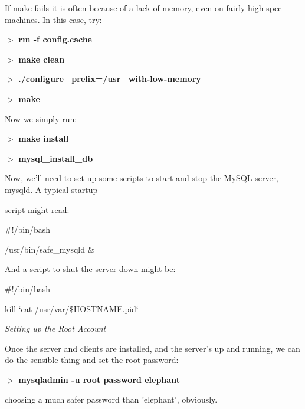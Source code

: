 \documentclass[a4paper,11pt]{book}
\begin{document}
\noindent 

\noindent If make fails it is often because of a lack of memory, even on fairly high-spec machines. In this case, try:

\noindent 

\noindent $>$ \textbf{rm -f config.cache}

\noindent $>$ \textbf{make clean}

\noindent $>$ \textbf{./configure --prefix=/usr --with-low-memory}

\noindent $>$ \textbf{make}

\noindent 

\noindent Now we simply run:

\noindent 

\noindent $>$ \textbf{make install}

\noindent $>$ \textbf{mysql\_install\_db}

\noindent 

\noindent 

\noindent Now, we'll need to set up some scripts to start and stop the MySQL server, mysqld. A typical startup

\noindent script might read:

\noindent 

\noindent 

\noindent \#!/bin/bash

\noindent 

\noindent /usr/bin/safe\_mysqld \&

\noindent 

\noindent And a script to shut the server down might be:

\noindent 

\noindent 

\noindent \#!/bin/bash

\noindent 

\noindent kill `cat /usr/var/\$HOSTNAME.pid`

\noindent 

\noindent \textit{Setting up the Root Account}

\noindent Once the server and clients are installed, and the server's up and running, we can do the sensible thing and set the root password:

\noindent 

\noindent $>$ \textbf{mysqladmin -u root password elephant}

\noindent 

\noindent choosing a much safer password than 'elephant', obviously.
\end{document}
